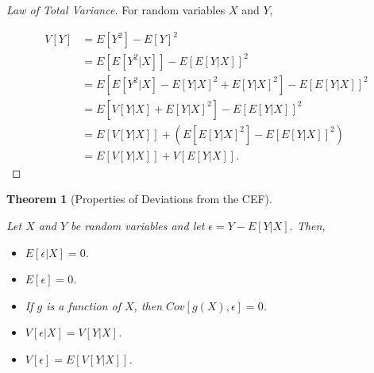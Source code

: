 \documentclass[
]{article}
\providecommand{\tightlist}{%
  \setlength{\itemsep}{0pt}\setlength{\parskip}{0pt}}
\newtheorem{theorem}{Theorem}[section]
\theoremstyle{definition}
\theoremstyle{definition}
\theoremstyle{definition}
\theoremstyle{remark}
\begin{document}
\begin{proof}[Law of Total Variance]

For random variables \(X\) and \(Y\),

\begin{align}
V[Y] &= E[Y^2] - E[Y]^2 \\
     &= E[E[Y^2 | X]] - E[E[Y | X]]^2 \\
     &= E[E[Y^2 | X] - E[Y | X]^2 + E[Y | X]^2] - E[E[Y | X]]^2 \\
     &= E[V[Y | X] + E[Y | X]^2] - E[E[Y | X]]^2 \\
     &= E[V[Y | X]] + (E[E[Y | X]^2] - E[E[Y | X]]^2) \\
     &= E[V[Y | X]] + V[E[Y | X]].

\end{align}

\end{proof}

\begin{theorem}[Properties of Deviations from the CEF]
\protect\hypertarget{thm:unlabeled-div-101}{}\label{thm:unlabeled-div-101}

Let \(X\) and \(Y\) be random variables and let \(\epsilon = Y - E[Y | X]\). Then,

\begin{itemize}
\tightlist
\item
  \(E[\epsilon | X] = 0\).
\item
  \(E[\epsilon] = 0\).
\item
  If \(g\) is a function of \(X\), then \(Cov[g(X), \epsilon] = 0\).
\item
  \(V[\epsilon | X] = V[Y | X]\).
\item
  \(V[\epsilon] = E[V[Y | X]]\).
\end{itemize}

\end{theorem}
\end{document}
